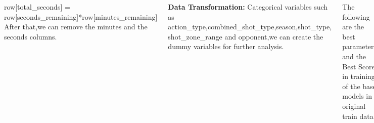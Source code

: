 \documentclass{tikzposter} %
\begin{document}
\begin{columns}
{  	\begin{description}
  		row[total\_seconds] = row[seconds\_remaining]*row[minutes\_remaining] \newline
After that,we can remove the minutes and the seconds columns.
  	\end{description}


\item \textbf{Data Transformation:} \newline 
Categorical variables such as action\_type,combined\_shot\_type,season,shot\_type, 
shot\_zone\_range 
and opponent,we can create the dummy variables for further analysis.



}





{
	The following are the best parameters and 
	the Best Score in training of 
	the base models 
	in original train data. 
	
	\item Best Parameters of Models
\begin{description}
	\item[RandomForest] 'criterion': 'entropy', 'max\_depth': 5, 
	'max\_features': None, 'n\_estimators': 100
	\item[LogisticRegression] 'C': 1, 'penalty': '11'
	\item[KNeighbors] 'algorithm': 'auto', 'leaf\_size': 10, 
	'n\_neighbors': 20, 'p': 5, 'weights': 'uniform'
	

\end{description}}
\end{columns}
\end{document}
